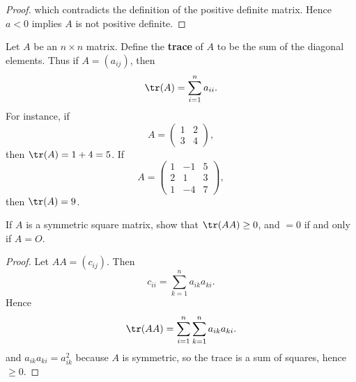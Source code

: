 {{\begin{Solution}
{\begin{proof}
                which contradicts the definition of the positive definite matrix. 
                Hence $a < 0$ implies $A$ is not positive definite. 
        \end{proof}
        }
    \end{Solution}
    \item
    \item
    \item
    Let $A$ be an $n \times n$ matrix. 
    Define the \textbf{trace} of $A$ to be the sum of the diagonal elements. 
    Thus if $A = (a_{ij})$, then 
    \begin{equation*}
        \tr(A) = \sum_{i = 1}^n a_{ii}. 
    \end{equation*}
    For instance, if 
    \begin{equation*}
        A = 
        \begin{pmatrix}
            1 & 2 \\
            3 & 4
        \end{pmatrix}, 
    \end{equation*}
    then $\tr(A) = 1 + 4 = 5$. 
    If 
    \begin{equation*}
        A = 
        \begin{pmatrix}
            1 &-1 & 5 \\
            2 & 1 & 3 \\
            1 &-4 & 7
        \end{pmatrix}, 
    \end{equation*}
    then $\tr(A) = 9$. 
    \item
    \item
    If $A$ is a symmetric square matrix, show that $\tr(AA) \geq 0$, and $= 0$ if and only if $A = O$. 
    \begin{Solution}
        \begin{proof}
            Let $AA = (c_{ij})$. 
            Then 
            \begin{equation*}
                c_{ii} = \sum_{k = 1}^{n} a_{ik} a_{ki}. 
            \end{equation*}
            Hence 
            \begin{equation*}
                \tr(AA) = \sum_{i = 1}^{n} \sum_{k = 1}^{n} a_{ik} a_{ki}. 
            \end{equation*}
            and $a_{ik} a_{ki} = a_{ik}^2$ because $A$ is symmetric, so the trace is a sum of squares, hence $\geq 0$. 
        \end{proof}
    \end{Solution}
}}
